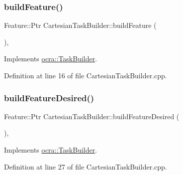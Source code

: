 \subsubsection{\texorpdfstring{build\+Feature()}{buildFeature()}}
{\footnotesize\ttfamily Feature\+::\+Ptr Cartesian\+Task\+Builder\+::build\+Feature (\begin{DoxyParamCaption}{ }\end{DoxyParamCaption})\hspace{0.3cm}{\ttfamily [protected]}, {\ttfamily [virtual]}}



Implements \hyperlink{classocra_1_1TaskBuilder_a58c0dc416a9607a344a080248ee26ac2}{ocra\+::\+Task\+Builder}.



Definition at line 16 of file Cartesian\+Task\+Builder.\+cpp.

\hypertarget{classocra_1_1CartesianTaskBuilder_a308b204435c4063991d8101c0a8c512c}{}\label{classocra_1_1CartesianTaskBuilder_a308b204435c4063991d8101c0a8c512c} 
\subsubsection{\texorpdfstring{build\+Feature\+Desired()}{buildFeatureDesired()}}
{\footnotesize\ttfamily Feature\+::\+Ptr Cartesian\+Task\+Builder\+::build\+Feature\+Desired (\begin{DoxyParamCaption}{ }\end{DoxyParamCaption})\hspace{0.3cm}{\ttfamily [protected]}, {\ttfamily [virtual]}}



Implements \hyperlink{classocra_1_1TaskBuilder_a7a2c8bcc5d95160d0e48806a2648f1a5}{ocra\+::\+Task\+Builder}.



Definition at line 27 of file Cartesian\+Task\+Builder.\+cpp.

\hypertarget{classocra_1_1CartesianTaskBuilder_a9e3175e5792c5ed9a7e3febbe458d21c}{}\label{classocra_1_1CartesianTaskBuilder_a9e3175e5792c5ed9a7e3febbe458d21c} 
